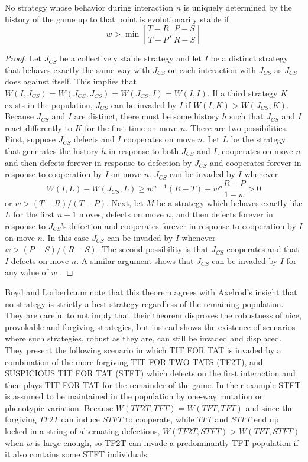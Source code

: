 \begin{theorem}
No strategy whose behavior during interaction $n$ is uniquely determined by the history of the game up to that point is evolutionarily stable if
\[
w > \min \left[ \frac{T-R}{T-P}, \frac{P-S}{R-S} \right]
\]
\end{theorem}
\begin{proof}
Let $J_{CS}$ be a collectively stable strategy and let $I$ be a distinct strategy that behaves exactly the same way with $J_{CS}$ on each interaction with $J_{CS}$ as $J_{CS}$ does against itself. This implies that $W(I, J_{CS}) = W (J_{CS}, J_{CS}) = W(J_{CS}, I) = W(I, I)$. If a third strategy $K$ exists in the population, $J_{CS}$ can be invaded by $I$ if $W(I, K) > W(J_{CS}, K)$. Because $J_{CS}$ and $I$ are distinct, there must be some history $h$ such that $J_{CS}$ and $I$ react differently to $K$ for the first time on move $n$. There are two possibilities. First, suppose $J_{CS}$ defects and $I$ cooperates on move $n$. Let $L$ be the strategy that generates the history $h$ in response to both $J_{CS}$ and $I$, cooperates on move $n$ and then defects forever in response to defection by $J_{CS}$ and cooperates forever in response to cooperation by $I$ on move $n$. $J_{CS}$ can be invaded by $I$ whenever
\[
W(I, L) - W(J_{CS}, L) \geq w^{n-1} (R-T) + w^n \frac{R- P}{1-w} > 0
\]
or $w > (T-R) / (T-P)$. Next, let $M$ be a strategy which behaves exactly like $L$ for the first $n-1$ moves, defects on move $n$, and then defects forever in response to $J_{CS}$'s defection and cooperates forever in response to cooperation by $I$ on move $n$. In this case $J_{CS}$ can be invaded by $I$ whenever $w > (P-S) / (R-S)$. The second possibility is that $J_{CS}$ cooperates and that $I$ defects on move $n$. A similar argument shows that $J_{CS}$ can be invaded by $I$ for any value of $w$ \cite{Boyd_Lorberbaum_1987}.
\end{proof}

Boyd and Lorberbaum note that this theorem agrees with Axelrod's insight that no strategy is strictly a best strategy regardless of the remaining population. They are careful to not imply that their theorem disproves the robustness of nice, provokable and forgiving strategies, but instead shows the existence of scenarios where such strategies, robust as they are, can still be invaded and displaced. They present the following scenario in which TIT FOR TAT is invaded by a combination of the more forgiving TIT FOR TWO TATS (TF2T), and SUSPICIOUS TIT FOR TAT (STFT) which defects on the first interaction and then plays TIT FOR TAT for the remainder of the game. In their example STFT is assumed to be maintained in the population by one-way mutation or phenotypic variation. Because $W(TF2T, TFT) = W(TFT, TFT)$ and since the forgiving $TF2T$ can induce $STFT$ to cooperate, while $TFT$ and $STFT$ end up locked in a string of alternating defections, $W(TF2T, STFT) > W(TFT, STFT)$ when $w$ is large enough, so TF2T can invade a predominantly TFT population if it also contains some STFT individuals.

